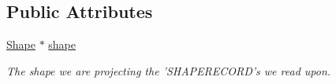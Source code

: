 \subsection*{Public Attributes}
\begin{DoxyCompactItemize}
\item 
\hypertarget{classjswf_1_1flash_1_1tags_1_1_define_shape_tag_aea6e9d6845a5af581a1dc39ab97d2631}{\hyperlink{classjswf_1_1flash_1_1_shape}{Shape} $\ast$ \hyperlink{classjswf_1_1flash_1_1tags_1_1_define_shape_tag_aea6e9d6845a5af581a1dc39ab97d2631}{shape}}\label{classjswf_1_1flash_1_1tags_1_1_define_shape_tag_aea6e9d6845a5af581a1dc39ab97d2631}

\begin{DoxyCompactList}\small\item\em The shape we are projecting the 'S\+H\+A\+P\+E\+R\+E\+C\+O\+R\+D's we read upon. \end{DoxyCompactList}\end{DoxyCompactItemize}
